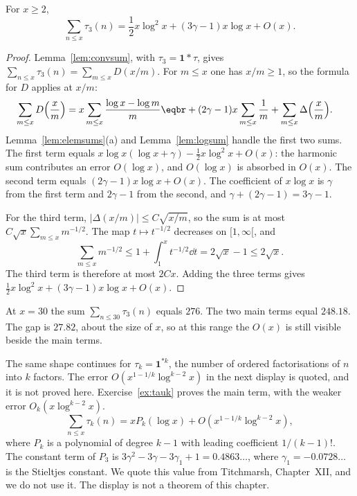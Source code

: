 \begin{theorem}\label{thm:tau3}
For $x\ge2$,
\[
\sum_{n\le x}\tau_3(n)=\frac12x\log^2x+(3\gamma-1)x\log x+O(x).
\]
\end{theorem}
\begin{proof}
Lemma~\ref{lem:convsum}, with $\tau_3=\mathbf1*\tau$, gives $\sum_{n\le x}\tau_3(n)=\sum_{m\le x}D(x/m)$. For $m\le x$ one has $x/m\ge1$, so the formula for $D$ applies at $x/m$:
\[
\begin{aligned}\sum_{m\le x}D\Bigl(\frac xm\Bigr)&=x\sum_{m\le x}\frac{\log x-\log m}m\eqbr+(2\gamma-1)x\sum_{m\le x}\frac1m+\sum_{m\le x}\Delta\Bigl(\frac xm\Bigr).\end{aligned}
\]
Lemma~\ref{lem:elemsums}(a) and Lemma~\ref{lem:logsum} handle the first two sums. The first term equals $x\log x(\log x+\gamma)-\frac12 x\log^2 x+O(x)$: the harmonic sum contributes an error $O(\log x)$, and $O(\log x)$ is absorbed in $O(x)$. The second term equals $(2\gamma-1)x\log x+O(x)$. The coefficient of $x\log x$ is $\gamma$ from the first term and $2\gamma-1$ from the second, and $\gamma+(2\gamma-1)=3\gamma-1$.

For the third term, $|\Delta(x/m)|\le C\sqrt{x/m}$, so the sum is at most $C\sqrt x\sum_{m\le x}m^{-1/2}$. The map $t\mapsto t^{-1/2}$ decreases on $[1,\infty[$, and
\[
\sum_{m\le x}m^{-1/2}\le1+\int_1^x t^{-1/2}\dd t=2\sqrt x-1\le2\sqrt x.
\]
The third term is therefore at most $2Cx$. Adding the three terms gives $\frac12 x\log^2 x+(3\gamma-1)x\log x+O(x)$.
\end{proof}

At $x=30$ the sum $\sum_{n\le30}\tau_3(n)$ equals $276$. The two main terms equal $248.18$. The gap is $27.82$, about the size of $x$, so at this range the $O(x)$ is still visible beside the main terms.

The same shape continues for $\tau_k=\mathbf1^{*k}$, the number of ordered factorisations of $n$ into $k$ factors. The error $O(x^{1-1/k}\log^{k-2}x)$ in the next display is quoted, and it is not proved here. Exercise~\ref{ex:tauk} proves the main term, with the weaker error $O_k(x\log^{k-2}x)$.
\[
\sum_{n\le x}\tau_k(n)=xP_k(\log x)+O(x^{1-1/k}\log^{k-2}x),
\]
where $P_k$ is a polynomial of degree $k-1$ with leading coefficient $1/(k-1)!$. The constant term of $P_3$ is $3\gamma^2-3\gamma-3\gamma_1+1=0.4863\ldots$, where $\gamma_1=-0.0728\ldots$ is the Stieltjes constant. We quote this value from Titchmarsh, Chapter~XII, and we do not use it. The display is not a theorem of this chapter.

